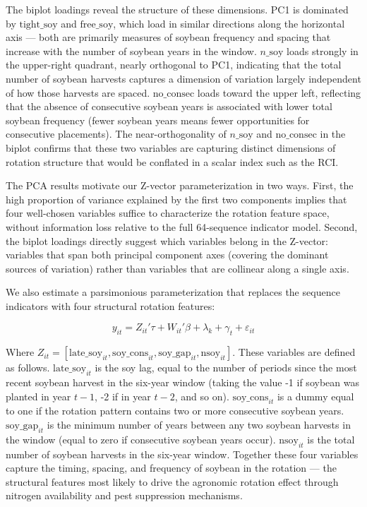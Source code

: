 \documentclass[12pt,letterpaper]{article}
\theoremstyle{remark}
\theoremstyle{plain}
\theoremstyle{definition}
\begin{document}
The biplot loadings reveal the structure of these dimensions. PC1 is dominated by $\text{tight\_soy}$ and $\text{free\_soy}$, which load in similar directions along the horizontal axis — both are primarily measures of soybean frequency and spacing that increase with the number of soybean years in the window. $n\_\text{soy}$ loads strongly in the upper-right quadrant, nearly orthogonal to PC1, indicating that the total number of soybean harvests captures a dimension of variation largely independent of how those harvests are spaced. $\text{no\_consec}$ loads toward the upper left, reflecting that the absence of consecutive soybean years is associated with lower total soybean frequency (fewer soybean years means fewer opportunities for consecutive placements). The near-orthogonality of $n\_\text{soy}$ and $\text{no\_consec}$ in the biplot confirms that these two variables are capturing distinct dimensions of rotation structure that would be conflated in a scalar index such as the RCI.

The PCA results motivate our Z-vector parameterization in two ways. First, the high proportion of variance explained by the first two components implies that four well-chosen variables suffice to characterize the rotation feature space, without information loss relative to the full 64-sequence indicator model. Second, the biplot loadings directly suggest which variables belong in the Z-vector: variables that span both principal component axes (covering the dominant sources of variation) rather than variables that are collinear along a single axis.

We also estimate a parsimonious parameterization that replaces the sequence indicators with four structural rotation features:

\begin{equation}
    y_{it}=Z_{it}'\tau+ W_{it}'\beta+\lambda_{k}+\gamma_{t}+\varepsilon_{it}
\end{equation}

Where $Z_{it}=\left[\text{late\_soy}_{it}, \text{soy\_cons}_{it}, \text{soy\_gap}_{it},\text{nsoy}_{it}\right]$. These variables are defined as follows. $\text{late\_soy}_{it}$ is the soy lag, equal to the number of periods since the most recent soybean harvest
in the six-year window (taking the value -1 if soybean was planted in year $t-1$, -2 if in year $t-2$, and so on).  $\text{soy\_cons}_{it}$ is a dummy equal to one if the rotation pattern contains two or more consecutive soybean years. $\text{soy\_gap}_{it}$ is the minimum number of years between any two soybean harvests in the window (equal to zero if consecutive soybean years occur). $\text{nsoy}_{it}$ is the total number of soybean harvests in the six-year window. Together these four variables capture the timing, spacing, and frequency of soybean in the rotation — the structural features most likely to drive the agronomic rotation effect through nitrogen availability and pest suppression mechanisms.
\end{document}
